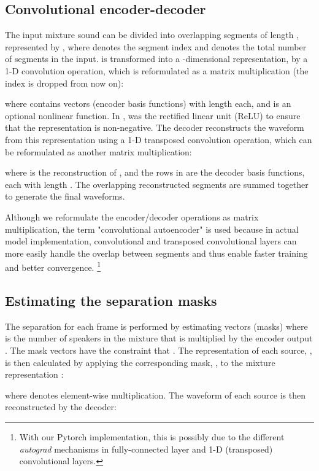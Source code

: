 \documentclass[journal]{IEEEtran}
\begin{document}
\subsection{Convolutional encoder-decoder}

The input mixture sound can be divided into overlapping segments of length , represented by , where  denotes the segment index and  denotes the total number of segments in the input.  is transformed into a -dimensional representation,  by a 1-D convolution operation, which is reformulated as a matrix multiplication (the index  is dropped from now on):

where  contains  vectors (encoder basis functions) with length  each, and  is an optional nonlinear function. In \cite{luo2018tasnet, luo2018real},  was the rectified linear unit (ReLU) to ensure that the representation is non-negative. The decoder reconstructs the waveform from this representation using a 1-D transposed convolution operation, which can be reformulated as another matrix multiplication:

where  is the reconstruction of , and the rows in  are the decoder basis functions, each with length . The overlapping reconstructed segments are summed together to generate the final waveforms.

Although we reformulate the encoder/decoder operations as matrix multiplication, the term "convolutional autoencoder" is used because in actual model implementation, convolutional and transposed convolutional layers can more easily handle the overlap between segments and thus enable faster training and better convergence. \footnote{With our Pytorch implementation, this is possibly due to the different \textit{autograd} mechanisms in fully-connected layer and 1-D (transposed) convolutional layers.}

\subsection{Estimating the separation masks}
\label{sec:mask}

The separation for each frame is performed by estimating  vectors (masks)  where  is the number of speakers in the mixture that is multiplied by the encoder output . The mask vectors  have the constraint that . The representation of each source, , is then calculated by applying the corresponding mask, , to the mixture representation :

where  denotes element-wise multiplication. The waveform of each source  is then reconstructed by the decoder:
\end{document}
